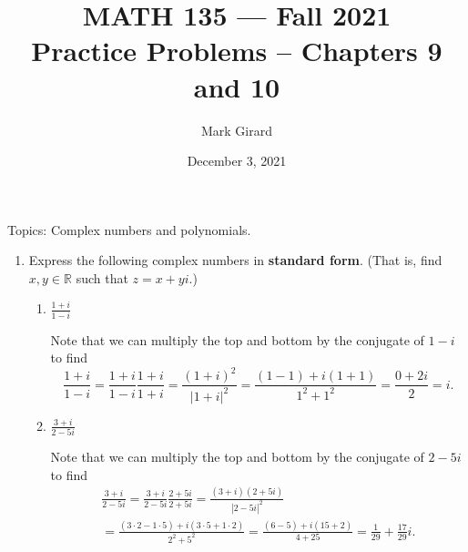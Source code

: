 \documentclass[11pt]{article}
\def\reals{\mathbb{R}}
\newif\ifshowsolution
\begin{document}
\title{MATH 135 --- Fall 2021\\ Practice Problems \ifshowsolution(Solutions)\fi -- Chapters 9 and 10}
\author{Mark Girard}
\date{December 3, 2021}

\maketitle

Topics: Complex numbers and polynomials.
 
\begin{enumerate}%
 \item Express the following complex numbers in \textbf{standard form}. (That is, find $x,y\in\reals$ such that $z=x+yi$.)
 
  \begin{enumerate}
   \item $\displaystyle\frac{1+i}{1-i}$
   \begin{Solution}
    Note that we can multiply the top and bottom by the conjugate of $1-i$ to find
    \[
     \frac{1+i}{1-i} = \frac{1+i}{1-i}\frac{1+i}{1+i} = \frac{(1+i)^2}{|1+i|^2} = \frac{(1-1) + i(1+1)}{1^2 + 1^2} = \frac{0+2i}{2} = i.
    \]
\begin{center}
\end{center}
   \end{Solution}


   \item $\displaystyle\frac{3+i}{2-5i}$
\begin{Solution}
    Note that we can multiply the top and bottom by the conjugate of $2-5i$ to find
    \begin{multline*}
    \frac{3+i}{2-5i} = \frac{3+i}{2-5i}\frac{2+5i}{2+5i} = \frac{(3+i)(2+5i)}{|2-5i|^2} \\= \frac{(3\cdot 2 - 1\cdot 5) + i(3\cdot 5 + 1\cdot 2)}{2^2 + 5^2} = \frac{(6-5)+i(15+2)}{4+25} = \frac{1}{29} + \frac{17}{29}i.
    \end{multline*}
    \begin{center}
\end{center}



\end{Solution}
\end{enumerate}
\end{enumerate}
\end{document}
